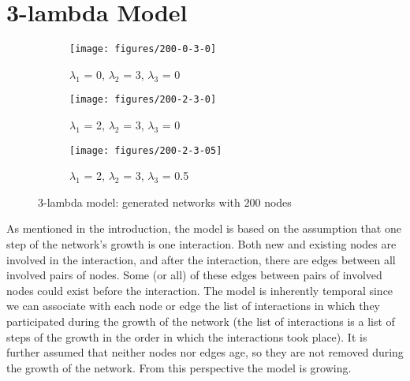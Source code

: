 \section{3-lambda Model} 
\label{sec:met}

\begin{figure*}[ht]
\centering
 \begin{subfigure}{17em}
  \centering
	\texttt{[image: figures/200-0-3-0]}
\caption{$\lambda_1$ = 0, $\lambda_2$ = 3, $\lambda_3$ = 0}
\label{fig:lambda2net}
 \end{subfigure}
 \begin{subfigure}{17em}
	\centering
		\texttt{[image: figures/200-2-3-0]}
		\caption{$\lambda_1$ = 2, $\lambda_2$ = 3, $\lambda_3$ = 0}
		\label{fig:lambda1net}
  \end{subfigure}
  \begin{subfigure}[ht]{17em}
		\centering
			\texttt{[image: figures/200-2-3-05]}
			\caption{$\lambda_1$ = 2, $\lambda_2$ = 3, $\lambda_3$ = 0.5}
			\label{fig:lambda3net}
  \end{subfigure}
	\caption{3-lambda model: generated networks with $200$ nodes}
\label{fig:L3D}
\end{figure*}

As mentioned in the introduction, the model is based on the assumption that one step of the network's growth is one interaction. Both new and existing nodes are involved in the interaction, and after the interaction, there are edges between all involved pairs of nodes. Some (or all) of these edges between pairs of involved nodes could exist before the interaction. The model is inherently temporal since we can associate with each node or edge the list of interactions in which they participated during the growth of the network (the list of interactions is a list of steps of the growth in the order in which the interactions took place). It is further assumed that neither nodes nor edges age, so they are not removed during the growth of the network. From this perspective the model is growing.

